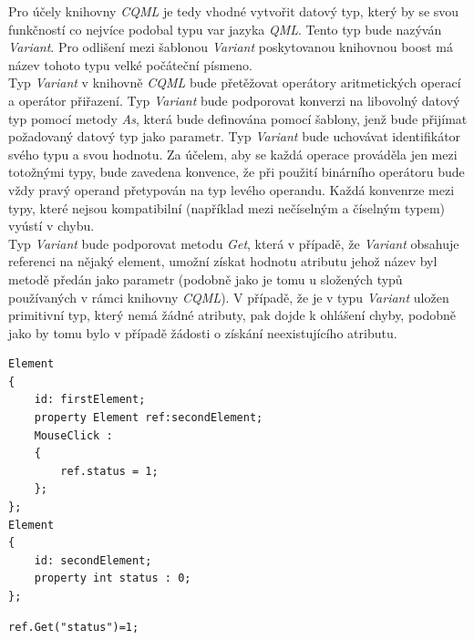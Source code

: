 \documentclass[11pt,twoside,a4paper]{book}
\begin{document}
Pro účely knihovny \textit{CQML} je tedy vhodné vytvořit datový typ, který by se svou funkčností co nejvíce podobal typu var jazyka \textit{QML}. Tento typ bude nazýván \textit{Variant}. Pro odlišení mezi šablonou \textit{Variant} poskytovanou knihovnou boost má název tohoto typu velké počáteční písmeno.\\
Typ \textit{Variant} v knihovně \textit{CQML} bude přetěžovat operátory aritmetických operací a operátor přiřazení. Typ \textit{Variant} bude podporovat konverzi na libovolný datový typ pomocí metody \textit{As}, která bude definována pomocí šablony, jenž bude přijímat požadovaný datový typ jako parametr. Typ \textit{Variant} bude uchovávat identifikátor svého typu a svou hodnotu. Za účelem, aby se každá operace prováděla jen mezi totožnými typy, bude zavedena konvence, že při použití binárního operátoru bude vždy pravý operand přetypován na typ levého operandu. Každá konvenrze mezi typy, které nejsou kompatibilní (například mezi nečíselným a číselným typem) vyústí v chybu.\\
Typ \textit{Variant} bude podporovat metodu \textit{Get}, která v případě, že \textit{Variant} obsahuje referenci na nějaký element, umožní získat hodnotu atributu jehož název byl metodě předán jako parametr (podobně jako je tomu u složených typů používaných v rámci knihovny \textit{CQML}). V případě, že je v typu \textit{Variant} uložen primitivní typ, který nemá žádné atributy, pak dojde k ohlášení chyby, podobně jako by tomu bylo v případě žádosti o získání neexistujícího atributu.\\
\begin{lstlisting}[frame=single,caption=\textit{CQML} kód měnící hodnotu atributu elementu\, prostřednictvím reference na daný element.,label=lst:var0N]
Element
{
	id: firstElement;
	property Element ref:secondElement;
	MouseClick :
	{
		ref.status = 1;
	};
};
Element
{
	id: secondElement;
	property int status : 0;
};
\end{lstlisting}
\begin{lstlisting}[frame=single,caption=Přeložený kód funkce\, který ilustruje nutnost vrácení reference metodou \textit{Get}.,label=lst:var00N]
ref.Get("status")=1;
\end{lstlisting}
\end{document}
